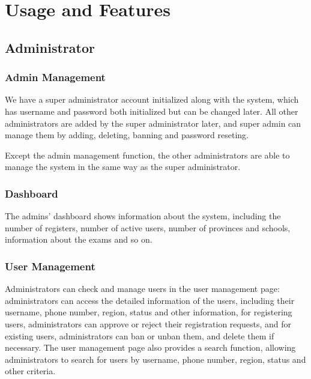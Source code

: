 \documentclass[12pt]{article}
\begin{document}
\section{Usage and Features}
\subsection{Administrator}
\subsubsection{Admin Management}
We have a super administrator account initialized along with the system, which has username and password both initialized but can be changed later. All other administrators are added by
the super administrator later, and super admin can manage them by adding, deleting, banning and password reseting.

Except the admin management
function, the other administrators are able to manage the system in the same way as the super administrator.
\subsubsection{Dashboard}
The admins' dashboard shows information about the system, including the number of registers, number of active users, number of provinces and schools,
information about the exams and so on.
\subsubsection{User Management}
Administrators can check and manage users in the user management page: administrators can access the detailed information of
the users, including their username, phone number, region, status and other information,
for registering users, administrators can approve or reject their registration requests, and for existing users, administrators can ban or unban them,
and delete them if necessary.
The user management page also provides a search function, allowing administrators to search for users by username, phone number, region,
status and other criteria.
\end{document}
